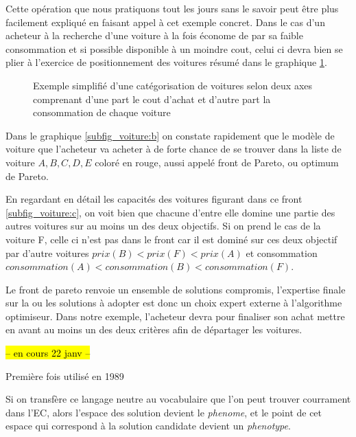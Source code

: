 Cette opération que nous pratiquons tout les jours sans le savoir peut être plus facilement expliqué en faisant appel à cet exemple concret. Dans le cas d'un acheteur à la recherche d'une voiture à la fois économe de par sa faible consommation et si possible disponible à un moindre cout, celui ci devra bien se plier à l'exercice de positionnement des voitures résumé dans le graphique \ref{fig:voiture}. 

\begin{figure}[h]
  \centering
  \qquad
  \caption{Exemple simplifié d'une catégorisation de voitures selon deux axes comprenant d'une part le cout d'achat et d'autre part la consommation de chaque voiture}
  \label{fig:voiture}
\end{figure}

Dans le graphique \ref{subfig_voiture:b} on constate rapidement que le modèle de voiture que l'acheteur va acheter à de forte chance de se trouver dans la liste de voiture ${A,B,C,D,E}$ coloré en rouge, aussi appelé front de Pareto, ou optimum de Pareto.

En regardant en détail les capacités des voitures figurant dans ce front \ref{subfig_voiture:c}, on voit bien que chacune d'entre elle domine une partie des autres voitures sur au moins un des deux objectifs. Si on prend le cas de la voiture F, celle ci n'est pas dans le front car il est dominé sur ces deux objectif par d'autre voitures $ prix(B) < prix(F) < prix(A) $ et consommation $consommation (A) < consommation(B) < consommation(F)$.

Le front de pareto renvoie un ensemble de solutions compromis, l'expertise finale sur la ou les solutions à adopter est donc un choix expert externe à l'algorithme optimiseur. Dans notre exemple, l'acheteur devra pour finaliser son achat mettre en avant au moins un des deux critères afin de départager les voitures.

\hl{-- en cours 22 janv --}



Première fois utilisé en 1989

Si on transfère ce langage neutre au vocabulaire que l'on peut trouver courrament dans l'EC, alors l'espace des solution devient le \textit{phenome}, et le point de cet espace qui correspond à la solution candidate devient un \textit{phenotype}.


